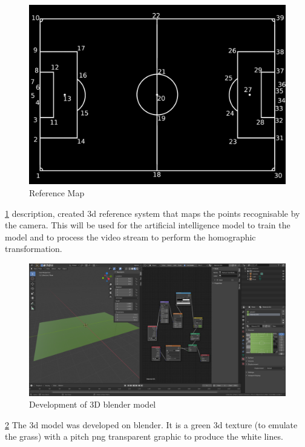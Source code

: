 \documentclass[
11pt,
twoside
]{report}
\begin{document}
\begin{figure}[H]
    \includegraphics[keepaspectratio, width=\columnwidth]{coordinates.png}
    \caption{Reference Map}
    \label{img:ref_map}
\end{figure}
\ref{img:ref_map} description, created 3d reference system that maps the points recognisable by the camera. This will be used for the artificial intelligence model to train the model and to process the video stream to perform the homographic transformation.
\begin{figure}[H]
    \includegraphics[keepaspectratio, width=\columnwidth]{Screenshot_from_2021-10-22_13-59-52.png}
    \caption{Development of 3D blender model}
    \label{img:texture}
\end{figure}
\ref{img:texture} The 3d model was developed on blender. It is a green 3d texture (to emulate the grass) with a pitch png transparent graphic to produce the white lines.
\end{document}
